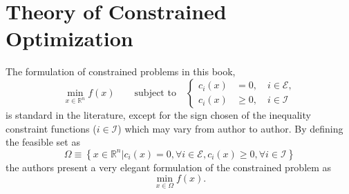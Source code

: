 \newpage
\section{Theory of Constrained Optimization}
The formulation of constrained problems in this book,
\begin{equation}
    \underset{x\in \mathbb{R}^n}{\min} f(x) \qquad \text{subject to} \quad
    \begin{cases}
        c_i(x) & = 0, \quad i\in\mathcal{E},   \\
        c_i(x) & \geq 0, \quad i\in\mathcal{I}
    \end{cases}
    \label{eq:constrained-problem}
\end{equation}
is standard in the literature, except for the sign chosen of the inequality constraint functions ($i\in\mathcal{I}$) which may vary from author to author.
By defining the feasible set as
\begin{equation}
    \Omega \equiv \left\{ x \in \mathbb{R}^n | c_i(x) = 0, \forall i\in\mathcal{E}, c_i(x) \geq 0, \forall i \in \mathcal{I} \right\}
    \label{eq:feasible-set}
\end{equation}
the authors present a very elegant formulation of the constrained problem as
\[
    \underset{x\in\Omega}{\min}f(x).
\]
